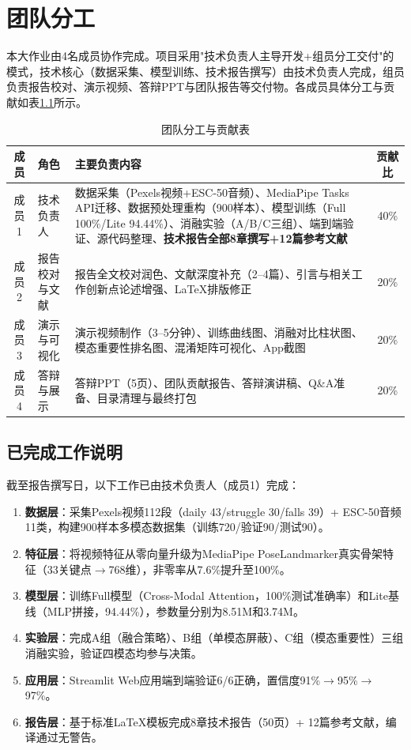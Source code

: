 \appendix

\chapter{团队分工}
\label{ch:team}

本大作业由4名成员协作完成。项目采用"技术负责人主导开发+组员分工交付"的模式，技术核心（数据采集、模型训练、技术报告撰写）由技术负责人完成，组员负责报告校对、演示视频、答辩PPT与团队报告等交付物。各成员具体分工与贡献如表\ref{tab:team-division}所示。

\begin{table}[H]
    \centering
    \caption{团队分工与贡献表}
    \label{tab:team-division}
    \begin{tabularx}{\textwidth}{clXc}
        \toprule
        成员 & 角色 & 主要负责内容 & 贡献比 \\
        \midrule
        成员1 & 技术负责人 & 数据采集（Pexels视频+ESC-50音频）、MediaPipe Tasks API迁移、数据预处理重构（900样本）、模型训练（Full 100\%/Lite 94.44\%）、消融实验（A/B/C三组）、端到端验证、源代码整理、\textbf{技术报告全部8章撰写+12篇参考文献} & 40\% \\
        成员2 & 报告校对与文献 & 报告全文校对润色、文献深度补充（2--4篇）、引言与相关工作创新点论述增强、LaTeX排版修正 & 20\% \\
        成员3 & 演示与可视化 & 演示视频制作（3--5分钟）、训练曲线图、消融对比柱状图、模态重要性排名图、混淆矩阵可视化、App截图 & 20\% \\
        成员4 & 答辩与展示 & 答辩PPT（5页）、团队贡献报告、答辩演讲稿、Q\&A准备、目录清理与最终打包 & 20\% \\
        \bottomrule
    \end{tabularx}
\end{table}

\section{已完成工作说明}

截至报告撰写日，以下工作已由技术负责人（成员1）完成：

\begin{enumerate}
    \item \textbf{数据层}：采集Pexels视频112段（daily 43/struggle 30/falls 39）+ ESC-50音频11类，构建900样本多模态数据集（训练720/验证90/测试90）。
    \item \textbf{特征层}：将视频特征从零向量升级为MediaPipe PoseLandmarker真实骨架特征（33关键点$\to$768维），非零率从7.6\%提升至100\%。
    \item \textbf{模型层}：训练Full模型（Cross-Modal Attention，100\%测试准确率）和Lite基线（MLP拼接，94.44\%），参数量分别为8.51M和3.74M。
    \item \textbf{实验层}：完成A组（融合策略）、B组（单模态屏蔽）、C组（模态重要性）三组消融实验，验证四模态均参与决策。
    \item \textbf{应用层}：Streamlit Web应用端到端验证6/6正确，置信度91\%$\to$95\%$\to$97\%。
    \item \textbf{报告层}：基于标准LaTeX模板完成8章技术报告（50页）+ 12篇参考文献，编译通过无警告。
\end{enumerate}

